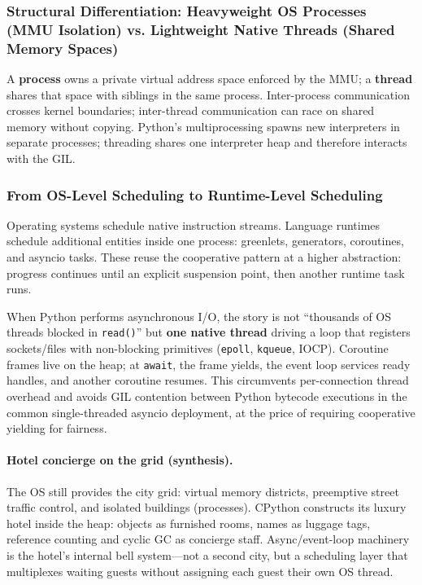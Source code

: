 \subsubsection{Structural Differentiation: Heavyweight OS Processes (MMU Isolation) vs. Lightweight Native Threads (Shared Memory Spaces)}

A \textbf{process} owns a private virtual address space enforced by the MMU; a \textbf{thread} shares that space with siblings in the same process. Inter-process communication crosses kernel boundaries; inter-thread communication can race on shared memory without copying. Python's multiprocessing spawns new interpreters in separate processes; threading shares one interpreter heap and therefore interacts with the GIL.

\subsubsection{From OS-Level Scheduling to Runtime-Level Scheduling}

Operating systems schedule native instruction streams. Language runtimes schedule additional entities inside one process: greenlets, generators, coroutines, and asyncio tasks. These reuse the cooperative pattern at a higher abstraction: progress continues until an explicit suspension point, then another runtime task runs.

When Python performs asynchronous I/O, the story is not ``thousands of OS threads blocked in \texttt{read()}'' but \textbf{one native thread} driving a loop that registers sockets/files with non-blocking primitives (\texttt{epoll}, \texttt{kqueue}, IOCP). Coroutine frames live on the heap; at \texttt{await}, the frame yields, the event loop services ready handles, and another coroutine resumes. This circumvents per-connection thread overhead and avoids GIL contention between Python bytecode executions in the common single-threaded asyncio deployment, at the price of requiring cooperative yielding for fairness.

\paragraph{Hotel concierge on the grid (synthesis).}
The OS still provides the city grid: virtual memory districts, preemptive street traffic control, and isolated buildings (processes). CPython constructs its luxury hotel inside the heap: objects as furnished rooms, names as luggage tags, reference counting and cyclic GC as concierge staff. Async/event-loop machinery is the hotel's internal bell system---not a second city, but a scheduling layer that multiplexes waiting guests without assigning each guest their own OS thread.
